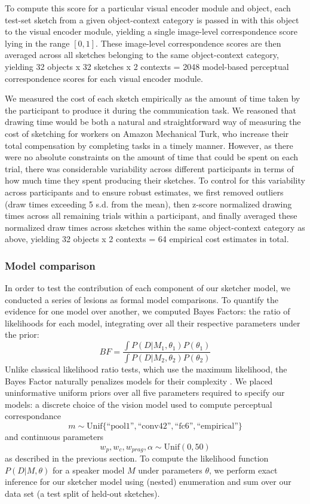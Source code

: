 \documentclass[9pt,twocolumn,twoside]{pnas-new}
\begin{document}
{To compute this score for a particular visual encoder module and object, each test-set sketch from a given object-context category is passed in with this object to the visual encoder module, yielding a single image-level correspondence score lying in the range $[0,1]$. These image-level correspondence scores are then averaged across all sketches belonging to the same object-context category, yielding 32 objects x 32 sketches x 2 contexts  = 2048 model-based perceptual correspondence scores for each visual encoder module.

We measured the cost of each sketch empirically as the amount of time taken by the participant to produce it during the communication task. We reasoned that drawing time would be both a natural and straightforward way of measuring the cost of sketching for workers on Amazon Mechanical Turk, who increase their total compensation by completing tasks in a timely manner. However, as there were no absolute constraints on the amount of time that could be spent on each trial, there was considerable variability across different participants in terms of how much time they spent producing their sketches. To control for this variability across participants and to ensure robust estimates, we first removed outliers (draw times exceeding 5 s.d. from the mean), then z-score normalized drawing times across all remaining trials within a participant, and finally averaged these normalized draw times across sketches within the same object-context category as above, yielding 32 objects x 2 contexts = 64 empirical cost estimates in total.

\subsubsection*{Model comparison}

In order to test the contribution of each component of our sketcher model, we conducted a series of lesions as formal model comparisons.
To quantify the evidence for one model over another, we computed Bayes Factors:
the ratio of likelihoods for each model, integrating over all their respective parameters under the prior:
$$BF = \frac{\int P(D | M_1, \theta_1)P(\theta_1)}{\int P(D | M_2, \theta_2)P(\theta_2)}$$
Unlike classical likelihood ratio tests, which use the maximum likelihood, the Bayes Factor naturally penalizes models for their complexity \cite{rouder}.
We placed uninformative uniform priors over all five parameters required to specify our models: a discrete choice of the vision model used to compute perceptual correspondance
$$m \sim \textrm{Unif}\{\textrm{``pool1''}, \textrm{``conv42''}, \textrm{``fc6''}, \textrm{``empirical''}\}$$
and continuous parameters
$$w_p, w_c, w_{prag}, \alpha \sim \textrm{Unif}(0, 50)$$
as described in the previous section. To compute the likelihood function $P(D | M, \theta)$ for a speaker model $M$ under parameters $\theta$, we perform exact inference for our sketcher model using (nested) enumeration and sum over our data set (a test split of held-out sketches).

}
\end{document}

